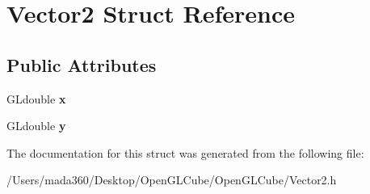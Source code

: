\hypertarget{struct_vector2}{}\section{Vector2 Struct Reference}
\label{struct_vector2}
\subsection*{Public Attributes}
\begin{DoxyCompactItemize}
\item 
\hypertarget{struct_vector2_a17fad60276aded44d52d7f1221cd2534}{}G\+Ldouble {\bfseries x}\label{struct_vector2_a17fad60276aded44d52d7f1221cd2534}

\item 
\hypertarget{struct_vector2_abce8b7f47e5a1d75486fa16c2aeefb14}{}G\+Ldouble {\bfseries y}\label{struct_vector2_abce8b7f47e5a1d75486fa16c2aeefb14}

\end{DoxyCompactItemize}


The documentation for this struct was generated from the following file\+:\begin{DoxyCompactItemize}
\item 
/\+Users/mada360/\+Desktop/\+Open\+G\+L\+Cube/\+Open\+G\+L\+Cube/Vector2.\+h\end{DoxyCompactItemize}
